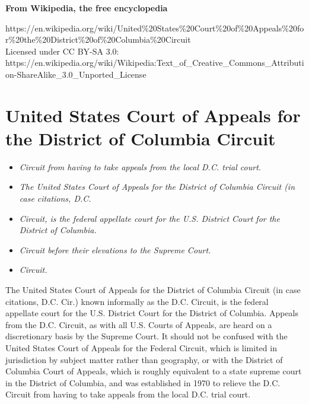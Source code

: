 \textbf{From Wikipedia, the free encyclopedia}

https://en.wikipedia.org/wiki/United\%20States\%20Court\%20of\%20Appeals\%20for\%20the\%20District\%20of\%20Columbia\%20Circuit\\
Licensed under CC BY-SA 3.0:\\
https://en.wikipedia.org/wiki/Wikipedia:Text\_of\_Creative\_Commons\_Attribution-ShareAlike\_3.0\_Unported\_License

\section{United States Court of Appeals for the District of Columbia
Circuit}\label{united-states-court-of-appeals-for-the-district-of-columbia-circuit}

\begin{itemize}
\item
  \emph{Circuit from having to take appeals from the local D.C. trial
  court.}
\item
  \emph{The United States Court of Appeals for the District of Columbia
  Circuit (in case citations, D.C.}
\item
  \emph{Circuit, is the federal appellate court for the U.S. District
  Court for the District of Columbia.}
\item
  \emph{Circuit before their elevations to the Supreme Court.}
\item
  \emph{Circuit.}
\end{itemize}

The United States Court of Appeals for the District of Columbia Circuit
(in case citations, D.C. Cir.) known informally as the D.C. Circuit, is
the federal appellate court for the U.S. District Court for the District
of Columbia. Appeals from the D.C. Circuit, as with all U.S. Courts of
Appeals, are heard on a discretionary basis by the Supreme Court. It
should not be confused with the United States Court of Appeals for the
Federal Circuit, which is limited in jurisdiction by subject matter
rather than geography, or with the District of Columbia Court of
Appeals, which is roughly equivalent to a state supreme court in the
District of Columbia, and was established in 1970 to relieve the D.C.
Circuit from having to take appeals from the local D.C. trial court.

